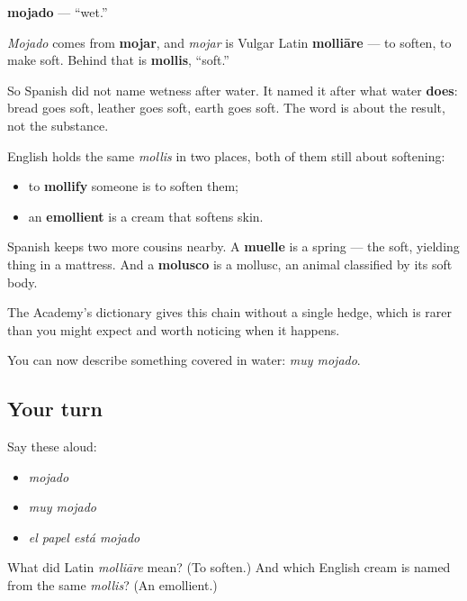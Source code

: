 \begin{cousinweb}
\textbf{mojado} — \textquotedblleft{}wet.\textquotedblright{}

\emph{Mojado} comes from \textbf{mojar}, and \emph{mojar} is Vulgar Latin \textbf{molliāre} — to soften, to make soft. Behind that is \textbf{mollis}, \textquotedblleft{}soft.\textquotedblright{}

So Spanish did not name wetness after water. It named it after what water \textbf{does}: bread goes soft, leather goes soft, earth goes soft. The word is about the result, not the substance.

English holds the same \emph{mollis} in two places, both of them still about softening:

\begin{itemize}
\raggedright
  \item to \textbf{mollify} someone is to soften them;
  \item an \textbf{emollient} is a cream that softens skin.
\end{itemize}

Spanish keeps two more cousins nearby. A \textbf{muelle} is a spring — the soft, yielding thing in a mattress. And a \textbf{molusco} is a mollusc, an animal classified by its soft body.

The Academy's dictionary gives this chain without a single hedge, which is rarer than you might expect and worth noticing when it happens.
\end{cousinweb}

\begin{grammarlens}[title={What you've built}]
You can now describe something covered in water: \emph{muy mojado}.
\end{grammarlens}

\subsection*{Your turn}
Say these aloud:

\begin{itemize}
\raggedright
  \item \emph{mojado}
  \item \emph{muy mojado}
  \item \emph{el papel está mojado}
\end{itemize}

\begin{tcolorbox}[breakable,colback=teal!4,colframe=teal!35!black,title={Before you move on}]
What did Latin \emph{molliāre} mean? (To soften.) And which English cream is named from the same \emph{mollis}? (An emollient.)
\end{tcolorbox}
